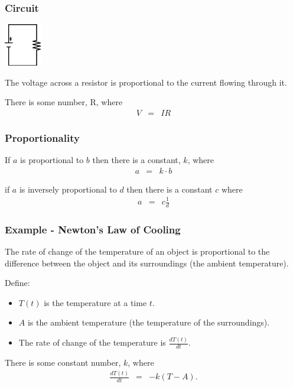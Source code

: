 \begin{frame}
  \frametitle{Circuit}
 
  \centerline{\includegraphics[height=5em]{img/simpleResistorCircuit}}
 
  The voltage across a resistor is proportional to the current flowing
  through it.

  {
    There is some number, R, where
    \begin{eqnarray*}
      V & = & IR
    \end{eqnarray*}
  }
\end{frame}

\begin{frame}
  \frametitle{Proportionality}
  
  If $a$ is proportional to $b$ then there is a constant, $k$, where 
  \begin{eqnarray*}
    a  & = & k \cdot b
  \end{eqnarray*}

  if $a$ is inversely proportional to $d$ then there is a constant $c$
  where 
  \begin{eqnarray*}
    a & = & c \frac{1}{d}
  \end{eqnarray*}
\end{frame}

\begin{frame}
  \frametitle{Example - Newton's Law of Cooling}

  The rate of change of the temperature of an object is proportional
  to the difference between the object and its surroundings (the
  ambient temperature).

  {

    Define:
    \begin{itemize}
    \item $T(t)$ is the temperature at a time $t$.
    \item $A$ is the ambient temperature (the temperature of the
      surroundings).
    \item The rate of change of the temperature is $\frac{dT(t)}{dt}$.
    \end{itemize}

  }

  {

    There is some constant number, $k$, where 
    \begin{eqnarray*}
      \frac{dT(t)}{dt} & = & -k (T-A).
    \end{eqnarray*}

  }


\end{frame}


